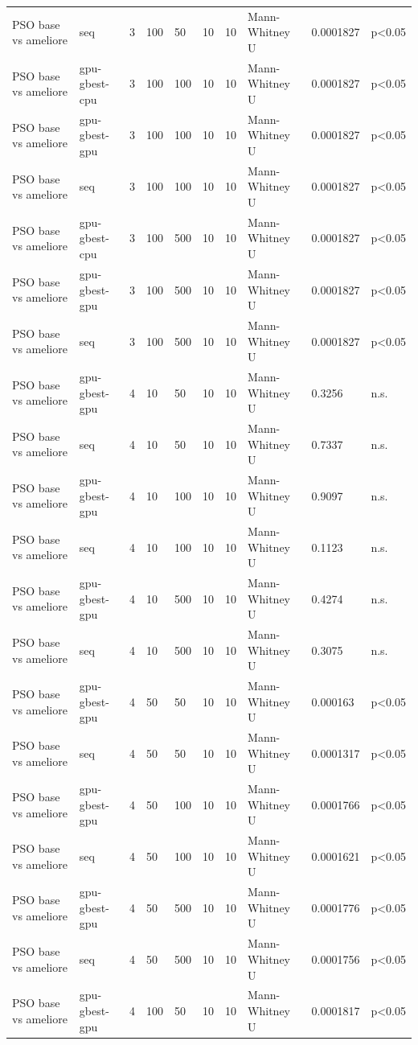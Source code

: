 \begin{table}[t]
\begin{tabular}{llllllllll}
PSO base vs ameliore & seq & 3 & 100 & 50 & 10 & 10 & Mann-Whitney U & 0.0001827 & p<0.05 \\
PSO base vs ameliore & gpu-gbest-cpu & 3 & 100 & 100 & 10 & 10 & Mann-Whitney U & 0.0001827 & p<0.05 \\
PSO base vs ameliore & gpu-gbest-gpu & 3 & 100 & 100 & 10 & 10 & Mann-Whitney U & 0.0001827 & p<0.05 \\
PSO base vs ameliore & seq & 3 & 100 & 100 & 10 & 10 & Mann-Whitney U & 0.0001827 & p<0.05 \\
PSO base vs ameliore & gpu-gbest-cpu & 3 & 100 & 500 & 10 & 10 & Mann-Whitney U & 0.0001827 & p<0.05 \\
PSO base vs ameliore & gpu-gbest-gpu & 3 & 100 & 500 & 10 & 10 & Mann-Whitney U & 0.0001827 & p<0.05 \\
PSO base vs ameliore & seq & 3 & 100 & 500 & 10 & 10 & Mann-Whitney U & 0.0001827 & p<0.05 \\
PSO base vs ameliore & gpu-gbest-gpu & 4 & 10 & 50 & 10 & 10 & Mann-Whitney U & 0.3256 & n.s. \\
PSO base vs ameliore & seq & 4 & 10 & 50 & 10 & 10 & Mann-Whitney U & 0.7337 & n.s. \\
PSO base vs ameliore & gpu-gbest-gpu & 4 & 10 & 100 & 10 & 10 & Mann-Whitney U & 0.9097 & n.s. \\
PSO base vs ameliore & seq & 4 & 10 & 100 & 10 & 10 & Mann-Whitney U & 0.1123 & n.s. \\
PSO base vs ameliore & gpu-gbest-gpu & 4 & 10 & 500 & 10 & 10 & Mann-Whitney U & 0.4274 & n.s. \\
PSO base vs ameliore & seq & 4 & 10 & 500 & 10 & 10 & Mann-Whitney U & 0.3075 & n.s. \\
PSO base vs ameliore & gpu-gbest-gpu & 4 & 50 & 50 & 10 & 10 & Mann-Whitney U & 0.000163 & p<0.05 \\
PSO base vs ameliore & seq & 4 & 50 & 50 & 10 & 10 & Mann-Whitney U & 0.0001317 & p<0.05 \\
PSO base vs ameliore & gpu-gbest-gpu & 4 & 50 & 100 & 10 & 10 & Mann-Whitney U & 0.0001766 & p<0.05 \\
PSO base vs ameliore & seq & 4 & 50 & 100 & 10 & 10 & Mann-Whitney U & 0.0001621 & p<0.05 \\
PSO base vs ameliore & gpu-gbest-gpu & 4 & 50 & 500 & 10 & 10 & Mann-Whitney U & 0.0001776 & p<0.05 \\
PSO base vs ameliore & seq & 4 & 50 & 500 & 10 & 10 & Mann-Whitney U & 0.0001756 & p<0.05 \\
PSO base vs ameliore & gpu-gbest-gpu & 4 & 100 & 50 & 10 & 10 & Mann-Whitney U & 0.0001817 & p<0.05 \\

\end{tabular}
\end{table}
